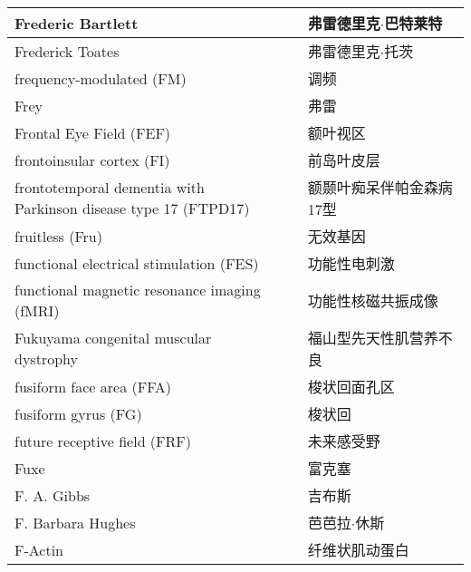 \begin{longtable}{lll}
	\midrule
	Frederic Bartlett     &&  弗雷德里克$\cdot$巴特莱特  \\
	
	\midrule
	Frederick Toates     &&  弗雷德里克$\cdot$托茨  \\
	
	\midrule
	frequency-modulated (FM)     &&  调频  \\
	
	\midrule
	Frey     &&  弗雷  \\
	
	\midrule
	Frontal Eye Field (FEF)     &&  额叶视区  \\
	
	\midrule
	frontoinsular cortex (FI)     &&  前岛叶皮层  \\
	
	\midrule
	\makecell[l]{frontotemporal dementia with \\Parkinson disease type 17 (FTPD17)}     &&  额颞叶痴呆伴帕金森病17型  \\
	
	\midrule
	fruitless (Fru)     &&  无效基因  \\
	
	\midrule
	functional electrical stimulation (FES)     &&  功能性电刺激  \\
	
	\midrule
	functional magnetic resonance imaging (fMRI)     &&  功能性核磁共振成像  \\
	
	\midrule
	Fukuyama congenital muscular dystrophy     &&  福山型先天性肌营养不良  \\
	
	\midrule
	fusiform face area (FFA)     &&  梭状回面孔区  \\
	
	\midrule
	fusiform gyrus (FG)     &&  梭状回  \\
	
	\midrule
	future receptive field (FRF)    &&  未来感受野  \\
	
	\midrule
	Fuxe     &&  富克塞  \\
	
	\midrule
	F. A. Gibbs     &&  吉布斯  \\
	
	\midrule
	F. Barbara Hughes     &&  芭芭拉$\cdot$休斯  \\
	
	\midrule
	F-Actin     &&  纤维状肌动蛋白  \\
	

\end{longtable}
